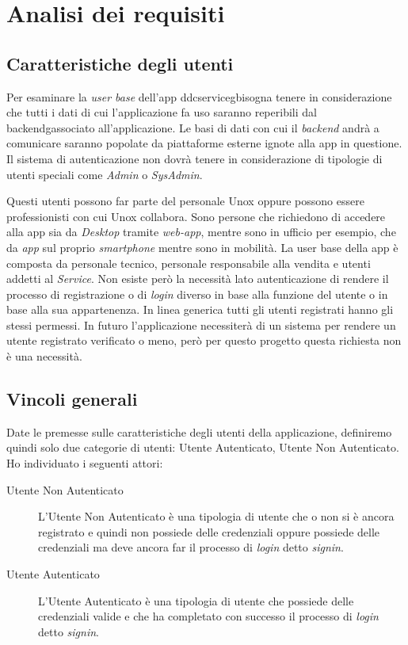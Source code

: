 \chapter{Analisi dei requisiti}
\label{chap:analisi_requisiti}

\section{Caratteristiche degli utenti}
Per esaminare la \textit{user base} dell'app \gls{ddcserviceg}\glox bisogna tenere in considerazione 
che tutti i dati di cui l'applicazione fa uso saranno reperibili dal \gls{backendg}\glox associato all'applicazione.
Le basi di dati con cui il \textit{backend} andrà a comunicare saranno popolate da piattaforme esterne ignote alla app in questione.
Il sistema di autenticazione non dovrà tenere in considerazione di tipologie di utenti speciali come \textit{Admin} o \textit{SysAdmin}.

Questi utenti possono far parte del personale Unox oppure possono essere professionisti con cui Unox collabora.
Sono persone che richiedono di accedere alla app sia da \textit{Desktop} tramite \textit{web-app}, mentre sono in ufficio per esempio, che da \textit{app} sul proprio \textit{smartphone} mentre sono in mobilità.
La user base della app è composta da personale tecnico, personale responsabile alla vendita e utenti addetti al \textit{Service}.
Non esiste però la necessità lato autenticazione di rendere il processo di registrazione o di \textit{login} diverso in base alla funzione del utente o in base alla sua appartenenza.
In linea generica tutti gli utenti registrati hanno gli stessi permessi.
In futuro l'applicazione necessiterà di un sistema per rendere un utente registrato verificato o meno, però per questo progetto questa richiesta non è una necessità.

\section{Vincoli generali}
Date le premesse sulle caratteristiche degli utenti della applicazione, definiremo quindi solo due categorie di utenti: Utente Autenticato, Utente Non Autenticato.
Ho individuato i seguenti attori:
\begin{description}
	\item[Utente Non Autenticato] L'Utente Non Autenticato è una tipologia di utente che o non si è ancora registrato e quindi non possiede delle credenziali oppure possiede delle credenziali ma deve ancora far il processo di \textit{login} detto \textit{signin}.
	\item[Utente Autenticato] L'Utente Autenticato è una tipologia di utente che possiede delle credenziali valide e che ha completato con successo il processo di \textit{login} detto \textit{signin}.
\end{description}


